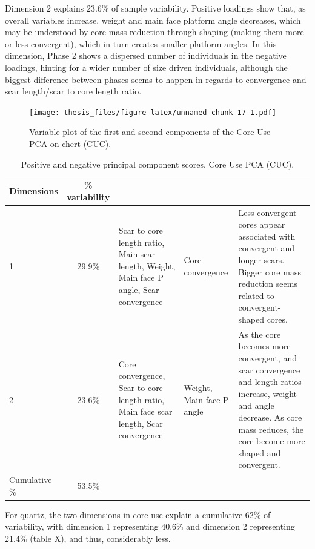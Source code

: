 \documentclass[12pt,twoside]{reedthesis}
\begin{document}
Dimension 2 explains 23.6\% of sample variability. Positive loadings show that, as overall variables increase, weight and main face platform angle decreases, which may be understood by core mass reduction through shaping (making them more or less convergent), which in turn creates smaller platform angles. In this dimension, Phase 2 shows a dispersed number of individuals in the negative loadings, hinting for a wider number of size driven individuals, although the biggest difference between phases seems to happen in regards to convergence and scar length/scar to core length ratio.
\begin{figure}
\centering
\texttt{[image: thesis\_files/figure-latex/unnamed-chunk-17-1.pdf]}
\caption{\label{fig:unnamed-chunk-17}Variable plot of the first and second components of the Core Use PCA on chert (CUC).}
\end{figure}
\begin{table}[!h]

\caption{\label{tab:unnamed-chunk-18}Positive and negative principal component scores, Core Use PCA (CUC).}
\centering
\begin{tabular}[t]{lc>{\raggedright\arraybackslash}p{3cm}>{\raggedright\arraybackslash}p{3cm}>{\raggedright\arraybackslash}p{3cm}}
\toprule
\multicolumn{1}{c}{\textbf{Dimensions}} & \multicolumn{1}{c}{\textbf{\% variability}} & \multicolumn{1}{>{\centering\arraybackslash}p{3cm}}{\textbf{+}} & \multicolumn{1}{>{\centering\arraybackslash}p{3cm}}{\textbf{-}} & \multicolumn{1}{>{\centering\arraybackslash}p{3cm}}{\textbf{Interpretation}}\\
\midrule
1 & 29.9\% & Scar to core length ratio, Main scar length, Weight, Main face P angle, Scar convergence & Core convergence & Less convergent cores appear associated with convergent and longer scars. Bigger core mass reduction seems related to convergent-shaped cores.\\
2 & 23.6\% & Core convergence, Scar to core length ratio, Main face scar length, Scar convergence & Weight, Main face P angle & As the core becomes more convergent, and scar convergence and length ratios increase, weight and angle decrease. As core mass reduces, the core become more shaped and convergent.\\
Cumulative \% & 53.5\% &  &  & \\
\bottomrule
\end{tabular}
\end{table}
For quartz, the two dimensions in core use explain a cumulative 62\% of variability, with dimension 1 representing 40.6\% and dimension 2 representing 21.4\% (table X), and thus, considerably less.
\end{document}
